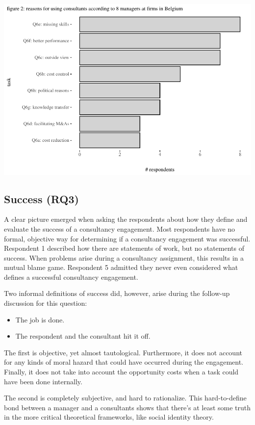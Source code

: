 \documentclass[12pt]{article}
\begin{document}
\(~\)

\begin{center}\includegraphics[width=0.75\linewidth]{2_ams_five_pager_files/figure-latex/unnamed-chunk-4-1} \end{center}

\subsection{Success (RQ3)}\label{success-rq3}

A clear picture emerged when asking the respondents about how they
define and evaluate the success of a consultancy engagement. Most
respondents have no formal, objective way for determining if a
consultancy engagement was successful. Respondent 1 described how there
are statements of work, but no statements of success. When problems
arise during a consultancy assignment, this results in a mutual blame
game. Respondent 5 admitted they never even considered what defines a
successful consultancy engagement.

Two informal definitions of success did, however, arise during the
follow-up discussion for this question:

\begin{itemize}
\item
  The job is done.
\item
  The respondent and the consultant hit it off.
\end{itemize}

The first is objective, yet almost tautological. Furthermore, it does
not account for any kinds of moral hazard that could have occurred
during the engagement. Finally, it does not take into account the
opportunity costs when a task could have been done internally.

The second is completely subjective, and hard to rationalize. This
hard-to-define bond between a manager and a consultants shows that
there's at least some truth in the more critical theoretical frameworks,
like social identity theory.
\end{document}
